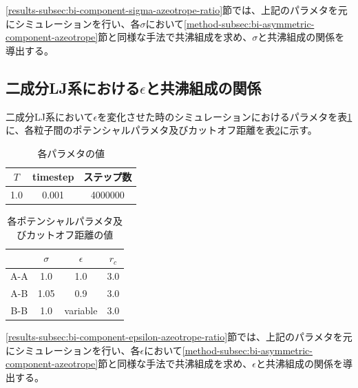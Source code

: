 \documentclass[titlepage]{jsreport}
\begin{document}
\ref{results-subsec:bi-component-sigma-azeotrope-ratio}節では、上記のパラメタを元にシミュレーションを行い、各$\sigma$において\ref{method-subsec:bi-asymmetric-component-azeotrope}節と同様な手法で共沸組成を求め、$\sigma$と共沸組成の関係を導出する。


\subsection{二成分LJ系における$\epsilon$と共沸組成の関係} \label{method-subsec:bi-component-epsilon-azeotrope-ratio}
二成分LJ系において${\epsilon}$を変化させた時のシミュレーションにおけるパラメタを表\ref{table:bi-component-epsilon-azeotrope-ratio-parameter}に、各粒子間のポテンシャルパラメタ及びカットオフ距離を表\ref{table:bi-component-epsilon-azeotrope-ratio-potential-parameter}に示す。

\begin{table}[htbp]
    \begin{center}
        \caption{各パラメタの値}
        \label{table:bi-component-epsilon-azeotrope-ratio-parameter}
        \begin{tabular}{c c c}
            $T$ & timestep & ステップ数 \\
            \hline
            1.0 & 0.001 & 4000000 \\
        \end{tabular}
    \end{center}
\end{table}

\begin{table}[htbp]
    \begin{center}
        \caption{各ポテンシャルパラメタ及びカットオフ距離の値}
        \label{table:bi-component-epsilon-azeotrope-ratio-potential-parameter}
        \begin{tabular}{c c c c}
            & $\sigma$ & $\epsilon$ & $r_c$ \\
            \hline
            A-A & 1.0 & 1.0 & 3.0 \\
            A-B & 1.05 & 0.9 & 3.0 \\
            B-B & 1.0 & variable & 3.0
        \end{tabular}
    \end{center}
\end{table}

\newpage
\ref{results-subsec:bi-component-epsilon-azeotrope-ratio}節では、上記のパラメタを元にシミュレーションを行い、各$\epsilon$において\ref{method-subsec:bi-asymmetric-component-azeotrope}節と同様な手法で共沸組成を求め、$\epsilon$と共沸組成の関係を導出する。
\end{document}
